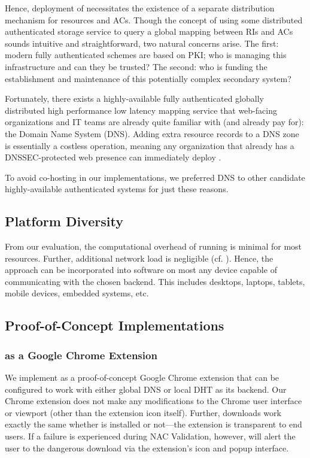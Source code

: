 Hence, deployment of \SYSTEM{} necessitates the existence of a separate
distribution mechanism for resources and ACs. Though the concept of using some
distributed authenticated storage service to query a global mapping between RIs
and ACs sounds intuitive and straightforward, two natural concerns arise. The
first: modern fully authenticated schemes are based on PKI; who is managing
this infrastructure and can they be trusted? The second: who is funding the
establishment and maintenance of this potentially complex secondary system?

Fortunately, there exists a highly-available fully authenticated globally
distributed high performance low latency mapping service that web-facing
organizations and IT teams are already quite familiar with (and already pay
for): the Domain Name System (DNS). Adding extra resource records to a DNS zone
is essentially a costless operation, meaning any organization that already has a
DNSSEC-protected web presence can immediately deploy \SYSTEM{}.

To avoid co-hosting in our implementations, we preferred DNS to other candidate
highly-available authenticated systems for just these reasons.

\subsection{Platform Diversity}

From our evaluation, the computational overhead of running \SYSTEM{} is minimal
for most resources. Further, additional network load is negligible (cf.
). Hence, the \SYSTEM{} approach can be incorporated into
software on most any device capable of communicating with the chosen backend.
This includes desktops, laptops, tablets, mobile devices, embedded systems, etc.

\subsection{Proof-of-Concept Implementations}

\subsubsection{\SYSTEM{} as a Google Chrome Extension}

We implement \SYSTEM{} as a proof-of-concept Google Chrome extension that can
be configured to work with either global DNS or local DHT as its backend. Our
Chrome extension does not make any modifications to the Chrome user interface or
viewport (other than the extension icon itself). Further, downloads work exactly
the same whether \SYSTEM{} is installed or not---the extension is transparent to
end users. If a failure is experienced during NAC Validation, however, \SYSTEM{}
will alert the user to the dangerous download via the extension's icon and popup
interface.

